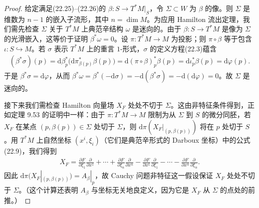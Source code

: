 \documentclass[../../main.tex]{subfiles}
\begin{document}
\begin{proof}
给定满足(22.25)--(22.26)的 $\beta:S\to T^*M|_S$，令 $\Sigma\subset W$ 为 $\beta$ 的像。则 $\Sigma$ 是维数为 $n-1$ 的嵌入子流形，其中 $n=\dim M$。为应用 Hamilton 流出定理，我们需先检查 $\Sigma$ 关于 $T^*M$ 上典范辛结构 $\omega$ 是迷向的。由于 $\beta:S\to T^*M$ 是像为 $\Sigma$ 的光滑嵌入，这等价于证明 $\beta^*\omega=0$。设 $\pi:T^*M\to M$ 为投影；则 $\pi\circ\beta$ 等于包含 $\iota:S\hookrightarrow M$。若 $\sigma$ 表示 $T^*M$ 上的重言 $1$-形式，$\sigma$ 的定义方程(22.3)蕴含
\begin{align*}
(\beta^*\sigma)(p)=\mathrm{d}\beta_p^*\big(\mathrm{d}\pi^*_{\beta(p)}\beta(p)\big)
=\mathrm{d}(\pi\circ\beta)_p^*\beta(p)=\mathrm{d}\iota_p^*\beta(p)=\mathrm{d}\varphi(p).
\end{align*}
于是 $\beta^*\sigma=\mathrm{d}\varphi$，从而 $\beta^*\omega=\beta^*(-\mathrm{d}\sigma)=-\mathrm{d}(\beta^*\sigma)=-\mathrm{d}(\mathrm{d}\varphi)=0$。故 $\Sigma$ 是迷向的。

接下来我们需检查 Hamilton 向量场 $X_F$ 处处不切于 $\Sigma$。这由非特征条件得到，正如定理 9.53 的证明中一样：由于 $\pi:T^*M\to M$ 限制为从 $\Sigma$ 到 $S$ 的微分同胚，若 $X_F$ 在某点 $(p,\beta(p))\in\Sigma$ 处切于 $\Sigma$，则 $\mathrm{d}\pi(X_F|_{(p,\beta(p))})$ 将在 $p$ 处切于 $S$。用 $T^*M$ 上自然坐标 $(x^i,\xi_i)$（它们是典范辛形式的 Darboux 坐标）中的公式(22.9)，我们得到
\begin{align*}
X_F=\frac{\partial F}{\partial\xi_1}\frac{\partial}{\partial x^1}+\cdots+\frac{\partial F}{\partial\xi_n}\frac{\partial}{\partial x^n}
-\frac{\partial F}{\partial x^1}\frac{\partial}{\partial\xi_1}-\cdots-\frac{\partial F}{\partial x^n}\frac{\partial}{\partial\xi_n}.
\end{align*}
因此 $\mathrm{d}\pi(X_F|_{(p,\beta(p))})=A_\beta|_p$，故 Cauchy 问题非特征这一假设保证 $X_F$ 处处不切于 $\Sigma$。（这个计算还表明 $A_\beta$ 与坐标无关地良定义，因为它是 $X_F$ 从 $\Sigma$ 的点处的前推。）


\end{proof}
\end{document}
